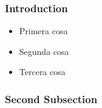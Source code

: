 \subsubsection{Introduction}

\begin{itemize}
\item Primera cosa
\item Segunda cosa
\item Tercera cosa
\end{itemize}

\subsubsection{Second Subsection}